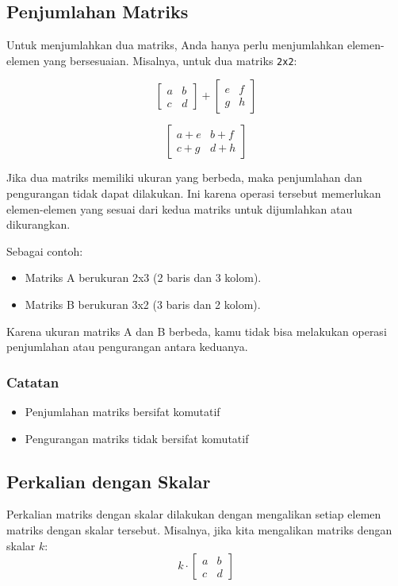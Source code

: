 \documentclass{article}
\begin{document}
\subsection{Penjumlahan Matriks}
Untuk menjumlahkan dua matriks, Anda hanya perlu menjumlahkan elemen-elemen yang bersesuaian. Misalnya, untuk dua matriks \verb|2x2|:

\[ \begin{bmatrix} a & b \\ c & d \end{bmatrix} + \begin{bmatrix} e & f \\ g & h
    \end{bmatrix} \]

\[ \begin{bmatrix} a + e & b + f \\ c + g & d + h \end{bmatrix} \]

Jika dua matriks memiliki ukuran yang berbeda, maka penjumlahan dan pengurangan tidak dapat dilakukan. Ini karena operasi tersebut memerlukan elemen-elemen yang sesuai dari kedua matriks untuk dijumlahkan atau dikurangkan.

Sebagai contoh:
\begin{itemize}
    \item Matriks A berukuran 2x3 (2 baris dan 3 kolom).
    \item Matriks B berukuran 3x2 (3 baris dan 2 kolom).
\end{itemize}

Karena ukuran matriks A dan B berbeda, kamu tidak bisa melakukan operasi penjumlahan atau pengurangan antara keduanya.

\subsubsection{Catatan}
\begin{itemize}
    \item Penjumlahan matriks bersifat komutatif
    \item Pengurangan matriks tidak bersifat komutatif
\end{itemize}

\subsection{Perkalian dengan Skalar}
Perkalian matriks dengan skalar dilakukan dengan mengalikan setiap elemen matriks dengan skalar tersebut. Misalnya, jika kita mengalikan matriks dengan skalar \( k \):
\[ k \cdot \begin{bmatrix} a & b \\ c & d
    \end{bmatrix} \]
\end{document}

